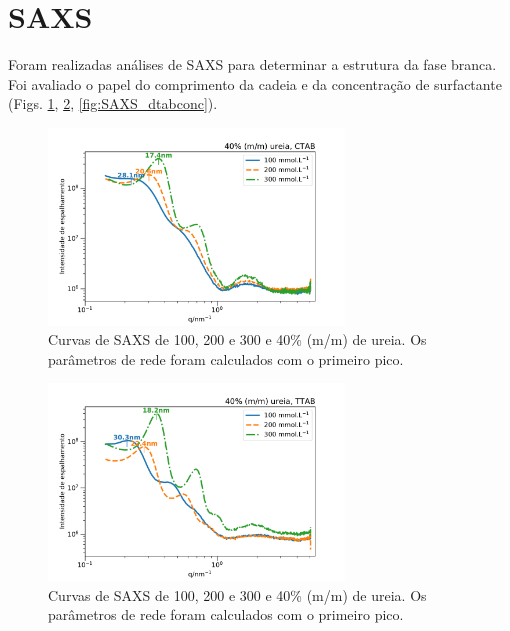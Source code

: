 	\FloatBarrier
\section{SAXS}

	Foram realizadas análises de SAXS para determinar a estrutura da fase branca. Foi avaliado o papel do comprimento da cadeia e da concentração de surfactante (Figs. \ref{fig:SAXS_ctabconc}, \ref{fig:SAXS_ttabconc}, \ref{fig:SAXS_dtabconc}).
	
	\begin{figure}[h]
		\centering
		\includegraphics[width=0.7\textwidth]{imagens/saxs/CTAB_conc}
		\caption{Curvas de SAXS de \CTAB{} 100, 200 e 300 \mM{} e 40\% (m/m) de ureia. Os parâmetros de rede foram calculados com o primeiro pico.}
		\label{fig:SAXS_ctabconc}
	\end{figure}
	
	\begin{figure}[h]
		\centering
		\includegraphics[width=0.7\textwidth]{imagens/saxs/TTAB_conc}
		\caption{Curvas de SAXS de \TTAB{} 100, 200 e 300 \mM{} e 40\% (m/m) de ureia. Os parâmetros de rede foram calculados com o primeiro pico.}
		\label{fig:SAXS_ttabconc}
	\end{figure}
	
